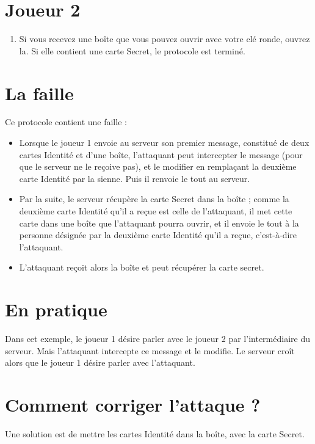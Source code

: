 \documentclass[a4paper,10pt]{article}
\begin{document}
\section{Joueur 2}
\begin{enumerate}
	\item Si vous recevez une boîte que vous pouvez ouvrir avec votre clé ronde, ouvrez la. Si elle contient une carte Secret, le protocole est terminé.
\end{enumerate}

\section{La faille}
Ce protocole contient une faille :
\begin{itemize}
	\item Lorsque le joueur 1 envoie au serveur son premier message, constitué de deux cartes Identité et d'une boîte, l'attaquant peut intercepter le message (pour que le serveur ne le reçoive pas), et le modifier en remplaçant la deuxième carte Identité par la sienne. Puis il renvoie le tout au serveur.
 \item Par la suite, le serveur récupère la carte Secret dans la boîte ; comme la deuxième carte Identité qu'il a reçue est celle de l'attaquant, il met cette carte dans une boîte que l'attaquant pourra ouvrir, et il envoie le tout à la personne désignée par la deuxième carte Identité qu'il a reçue, c'est-à-dire l'attaquant.
\item L'attaquant reçoit alors la boîte et peut récupérer la carte secret.
\end{itemize}

\section{En pratique}
Dans cet exemple, le joueur 1 désire parler avec le joueur 2 par l'intermédiaire du serveur. Mais l'attaquant intercepte ce message et le modifie. Le serveur croît alors que le joueur 1 désire parler avec l'attaquant.

\section{Comment corriger l'attaque ?}
Une solution est de mettre les cartes Identité dans la boîte, avec la carte Secret.
\end{document}
